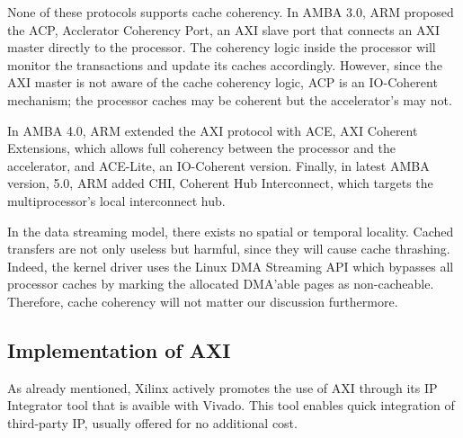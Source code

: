 None of these protocols supports cache coherency. 
In AMBA 3.0, ARM proposed the ACP, Acclerator Coherency Port, 
an AXI slave port that connects an AXI master directly to the processor.
The coherency logic inside the processor will monitor the transactions and update its caches accordingly.
However, since the AXI master is not aware of the cache coherency logic, ACP is an IO-Coherent mechanism;
the processor caches may be coherent but the accelerator's may not.

In AMBA 4.0, ARM extended the AXI protocol with ACE, AXI Coherent Extensions, which allows full coherency between
the processor and the accelerator, and ACE-Lite, an IO-Coherent version. 
Finally, in latest AMBA version, 5.0, ARM added CHI, Coherent Hub Interconnect, which targets the multiprocessor's
local interconnect hub.

In the data streaming model, there exists no spatial or temporal locality. 
Cached transfers are not only useless but harmful, since they will cause cache thrashing. 
Indeed, the kernel driver uses the Linux DMA Streaming API which bypasses all processor caches 
by marking the allocated DMA'able pages as non-cacheable.
Therefore, cache coherency will not matter our discussion furthermore.

\subsection{Implementation of AXI}

As already mentioned, Xilinx actively promotes the use of AXI through its IP Integrator tool that is avaible
with Vivado. This tool enables quick integration of third-party IP, usually offered for no additional cost.






